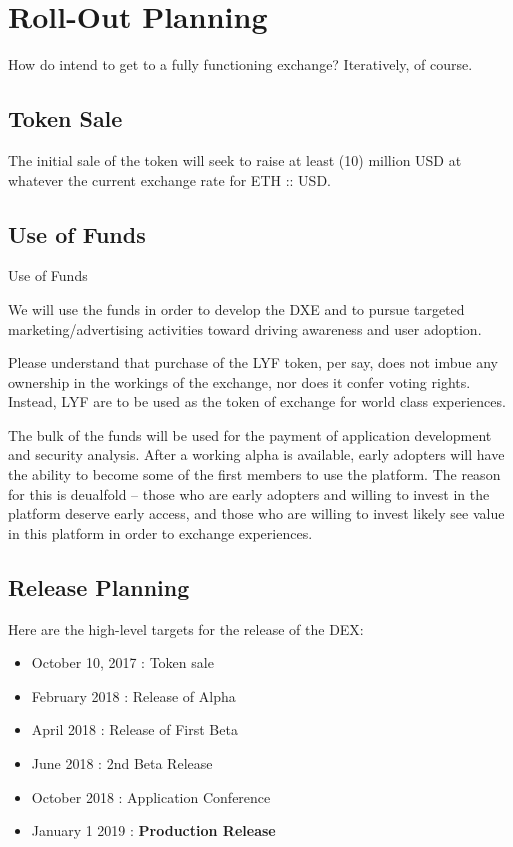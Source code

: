 \documentclass[11pt]{article}
\begin{document}
\section{Roll-Out Planning}
\label{sec-6}
How do intend to get to a fully functioning exchange? Iteratively, of course.

\subsection{Token Sale}
\label{sec-6-1}
The initial sale of the token will seek to raise at least (10) million USD at whatever the current exchange rate for ETH :: USD.

\subsection{Use of Funds}
\label{sec-6-2}
Use of Funds

We will use the funds in order to develop the DXE and to pursue targeted marketing/advertising activities toward driving awareness and user adoption.

Please understand that purchase of the LYF token, per say, does not imbue any ownership in the workings of the exchange, nor does it confer voting rights. Instead, LYF are to be used as the token of exchange for world class experiences.

The bulk of the funds will be used for the payment of application development and security analysis. After a working alpha is available, early adopters will have the ability to become some of the first members to use the platform. The reason for this is deualfold -- those who are early adopters and willing to invest in the platform deserve early access, and those who are willing to invest likely see value in this platform in order to exchange experiences.

\subsection{Release Planning}
\label{sec-6-3}
Here are the high-level targets for the release of the DEX:

\begin{itemize}
\item{October 10, 2017 : Token sale}
\item{February 2018 : Release of Alpha}
\item{April 2018 : Release of First Beta}
\item{June 2018 : 2nd Beta Release}
\item{October 2018 : Application Conference}
\item{January 1 2019 : \bf Production Release}

\end{itemize}
\end{document}
